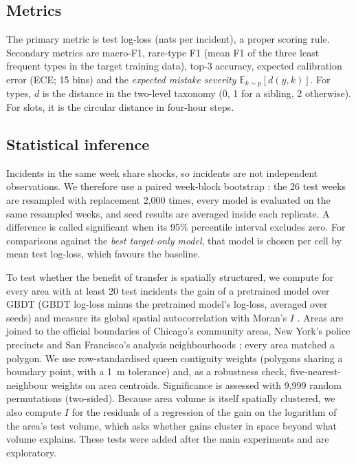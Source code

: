 \documentclass[11pt]{article}
\begin{document}
\subsection{Metrics}
The primary metric is test log-loss (nats per incident), a proper scoring rule. Secondary metrics are macro-F1, rare-type F1 (mean F1 of the three least frequent types in the target training data), top-3 accuracy, expected calibration error (ECE; 15 bins) and the \emph{expected mistake severity} $\mathbb{E}_{k\sim p}[d(y,k)]$. For types, $d$ is the distance in the two-level taxonomy (0, 1 for a sibling, 2 otherwise). For slots, it is the circular distance in four-hour steps.

\subsection{Statistical inference}
Incidents in the same week share shocks, so incidents are not independent observations. We therefore use a paired week-block bootstrap \citep{kunsch1989}: the 26 test weeks are resampled with replacement 2,000 times, every model is evaluated on the same resampled weeks, and seed results are averaged inside each replicate. A difference is called significant when its 95\% percentile interval excludes zero. For comparisons against the \emph{best target-only model}, that model is chosen per cell by mean test log-loss, which favours the baseline.

To test whether the benefit of transfer is spatially structured, we compute for every area with at least 20 test incidents the gain of a pretrained model over GBDT (GBDT log-loss minus the pretrained model's log-loss, averaged over seeds) and measure its global spatial autocorrelation with Moran's $I$ \citep{moran1950}. Areas are joined to the official boundaries of Chicago's community areas, New York's police precincts and San Francisco's analysis neighbourhoods \citep{chicagoca2026,nypdpct2026,sfnhood2026}; every area matched a polygon. We use row-standardised queen contiguity weights (polygons sharing a boundary point, with a 1~m tolerance) and, as a robustness check, five-nearest-neighbour weights on area centroids. Significance is assessed with 9,999 random permutations (two-sided). Because area volume is itself spatially clustered, we also compute $I$ for the residuals of a regression of the gain on the logarithm of the area's test volume, which asks whether gains cluster in space beyond what volume explains. These tests were added after the main experiments and are exploratory.
\end{document}
